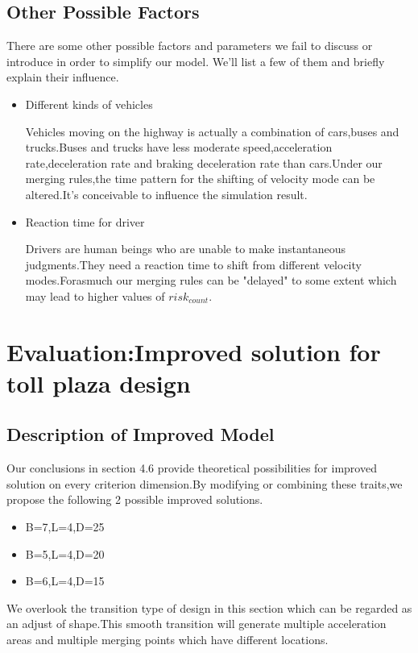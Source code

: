\subsection{Other Possible Factors}
There are some other possible factors and parameters we fail to discuss or introduce in order to simplify our model. We'll list a few of them and briefly explain their influence.
\begin{itemize}
\item{Different kinds of vehicles}

Vehicles moving on the highway is actually a combination of cars,buses and trucks.Buses and trucks have less moderate speed,acceleration rate,deceleration rate and braking deceleration rate than cars.Under our merging rules,the time pattern for the shifting of velocity mode can be altered.It's conceivable to influence the simulation result.
\item{Reaction time for driver}

Drivers are human beings who are unable to make instantaneous judgments.They need a reaction time to shift from different velocity modes.Forasmuch our merging rules can be "delayed" to some extent which may lead to higher values of $risk_{count}$.
\end{itemize}



\section{Evaluation:Improved solution for toll plaza design}
\subsection{Description of Improved Model}
Our conclusions in section 4.6 provide theoretical possibilities for improved solution on every criterion dimension.By modifying or combining these traits,we propose the following 2 possible improved solutions.
\begin{itemize}
\item
B=7,L=4,D=25
\item
B=5,L=4,D=20
\item
B=6,L=4,D=15
\end{itemize}

We overlook the transition type of design in this section which can be regarded as an adjust of shape.This smooth transition will generate multiple acceleration areas and multiple merging points which have different locations.

